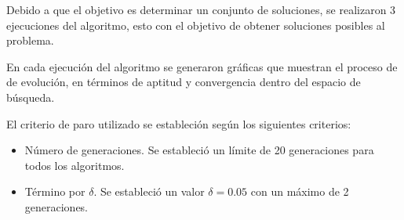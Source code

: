 Debido a que el objetivo es determinar un conjunto de soluciones, se realizaron 3 ejecuciones del algoritmo, esto con el objetivo de obtener soluciones posibles al problema.

En cada ejecución del algoritmo se generaron gráficas que muestran el proceso de de evolución, en términos de aptitud y convergencia dentro del espacio de búsqueda.

El criterio de paro utilizado se estableción según los siguientes criterios:

\begin{itemize}
	\item Número de generaciones. Se estableció un límite de 20 generaciones para todos los algoritmos.
	\item Término por $\delta$. Se estableció un valor $\delta=0.05$ con un máximo de 2 generaciones.
\end{itemize}
